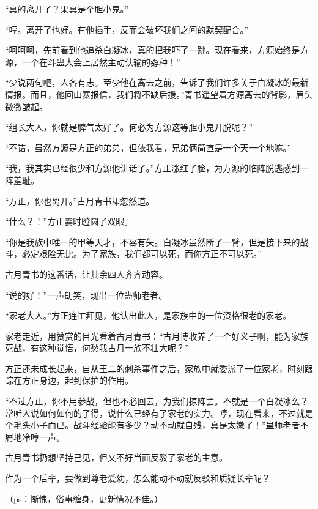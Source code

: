 \begin{this_body}
“真的离开了？果真是个胆小鬼。”

“哼。离开了也好。有他插手，反而会破坏我们之间的默契配合。”

“呵呵呵，先前看到他追杀白凝冰，真的把我吓了一跳。现在看来，方源始终是方源，一个在斗蛊大会上居然主动认输的孬种！”

“少说两句吧，人各有志。至少他在离去之前，告诉了我们许多关于白凝冰的最新情报。而且，他回山寨报信，我们将不缺后援。”青书遥望着方源离去的背影，眉头微微皱起。

“组长大人，你就是脾气太好了。何必为方源这等胆小鬼开脱呢？”

“不错，虽然方源是方正的弟弟，但依我看，兄弟俩简直是一个天一个地嘛。”

“我，我其实已经很少和方源他讲话了。”方正涨红了脸，为方源的临阵脱逃感到一阵羞耻。

“方正，你也离开。”古月青书却忽然道。

“什么？！”方正霎时瞪圆了双眼。

“你是我族中唯一的甲等天才，不容有失。白凝冰虽然断了一臂，但是接下来的战斗，必定艰险无比。为了家族，我们都可以死，而你方正不可以死。”

古月青书的这番话，让其余四人齐齐动容。

“说的好！”一声朗笑，现出一位蛊师老者。

“家老大人。”方正连忙拜见，他认出此人，是家族中的一位资格很老的家老。

家老走近，用赞赏的目光看着古月青书：“古月博收养了一个好义子啊，能为家族死战，有这种觉悟，何愁我古月一族不壮大呢？”

方正还未成长起来，自从王二的刺杀事件之后，家族中就委派了一位家老，时刻跟踪在方正身边，起到保护的作用。

“不过方正，你不用参战，但也不必回去，为我们掠阵罢。不就是一个白凝冰么？常听人说如何如何的了得，说什么已经有了家老的实力。哼，现在看来，不过就是个毛头小子而已。战斗经验能有多少？动不动就自残，真是太嫩了！”蛊师老者不屑地冷哼一声。

古月青书扔想坚持己见，但又不好当面反驳了家老的主意。

作为一个后辈，要做到尊老爱幼，怎么能动不动就反驳和质疑长辈呢？

（ps：惭愧，俗事缠身，更新情况不佳。）

\end{this_body}

